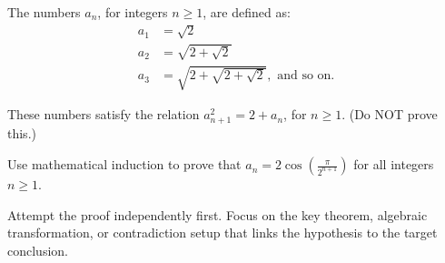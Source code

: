 
\begin{problem}
The numbers $a_n$, for integers $n \geq 1$, are defined as:
\begin{align*}
    a_1 &= \sqrt{2} \\
    a_2 &= \sqrt{2 + \sqrt{2}} \\
    a_3 &= \sqrt{2 + \sqrt{2 + \sqrt{2}}}, \text{ and so on.}
\end{align*}

These numbers satisfy the relation $a_{n+1}^2 = 2 + a_n$, for $n \geq 1$. (Do NOT prove this.)

Use mathematical induction to prove that $a_n = 2\cos\left(\frac{\pi}{2^{n+1}}\right)$ for all integers $n \geq 1$.
\end{problem}

\begin{hint}
Attempt the proof independently first. Focus on the key theorem, algebraic transformation, or contradiction setup that links the hypothesis to the target conclusion.
\end{hint}


